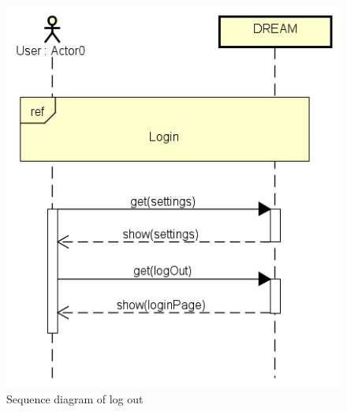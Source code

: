 \bigskip
\begin{figure}[H]
    \centering
    \includegraphics[scale=0.7]{Images/userLogsOut.png}
    \caption{Sequence diagram of log out}
\end{figure}

